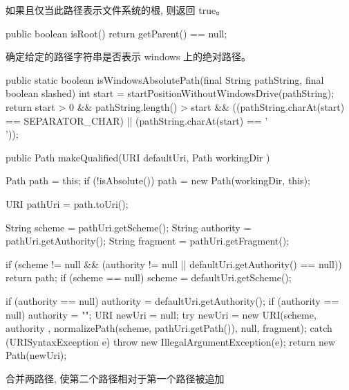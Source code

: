 如果且仅当此路径表示文件系统的根, 则返回 true。
\begin{java}
public boolean isRoot() {
  return getParent() == null;
}
\end{java}
确定给定的路径字符串是否表示 windows 上的绝对路径。
\begin{java}
public static boolean isWindowsAbsolutePath(final String pathString,
                                            final boolean slashed) {
  int start = startPositionWithoutWindowsDrive(pathString);
  return start > 0
      && pathString.length() > start
      && ((pathString.charAt(start) == SEPARATOR_CHAR) ||
          (pathString.charAt(start) == '\\'));
}
\end{java}
\begin{java}
public Path makeQualified(URI defaultUri, Path workingDir ) {
  Path path = this;
  if (!isAbsolute()) {
    path = new Path(workingDir, this);
  }

  URI pathUri = path.toUri();

  String scheme = pathUri.getScheme();
  String authority = pathUri.getAuthority();
  String fragment = pathUri.getFragment();

  if (scheme != null &&
      (authority != null || defaultUri.getAuthority() == null))
    return path;
  if (scheme == null) {
    scheme = defaultUri.getScheme();
  }

  if (authority == null) {
    authority = defaultUri.getAuthority();
    if (authority == null) {
      authority = "";
    }
  }
  URI newUri = null;
  try {
    newUri = new URI(scheme, authority ,
      normalizePath(scheme, pathUri.getPath()), null, fragment);
  } catch (URISyntaxException e) {
    throw new IllegalArgumentException(e);
  }
  return new Path(newUri);
}
\end{java}
合并两路径, 使第二个路径相对于第一个路径被追加
